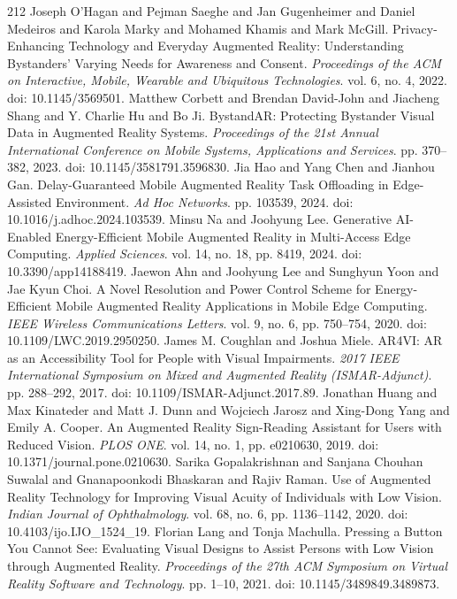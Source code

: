 \begin{thebibliography}{212}
 Joseph O'Hagan and Pejman Saeghe and Jan Gugenheimer and Daniel Medeiros and Karola Marky and Mohamed Khamis and Mark McGill. Privacy-Enhancing Technology and Everyday Augmented Reality: Understanding Bystanders' Varying Needs for Awareness and Consent. \emph{Proceedings of the ACM on Interactive, Mobile, Wearable and Ubiquitous Technologies}. vol. 6, no. 4, 2022. doi: 10.1145/3569501.
 Matthew Corbett and Brendan David-John and Jiacheng Shang and Y. Charlie Hu and Bo Ji. {BystandAR}: Protecting Bystander Visual Data in Augmented Reality Systems. \emph{Proceedings of the 21st Annual International Conference on Mobile Systems, Applications and Services}. pp. 370--382, 2023. doi: 10.1145/3581791.3596830.
 Jia Hao and Yang Chen and Jianhou Gan. Delay-Guaranteed Mobile Augmented Reality Task Offloading in Edge-Assisted Environment. \emph{Ad Hoc Networks}. pp. 103539, 2024. doi: 10.1016/j.adhoc.2024.103539.
 Minsu Na and Joohyung Lee. Generative AI-Enabled Energy-Efficient Mobile Augmented Reality in Multi-Access Edge Computing. \emph{Applied Sciences}. vol. 14, no. 18, pp. 8419, 2024. doi: 10.3390/app14188419.
 Jaewon Ahn and Joohyung Lee and Sunghyun Yoon and Jae Kyun Choi. A Novel Resolution and Power Control Scheme for Energy-Efficient Mobile Augmented Reality Applications in Mobile Edge Computing. \emph{IEEE Wireless Communications Letters}. vol. 9, no. 6, pp. 750--754, 2020. doi: 10.1109/LWC.2019.2950250.
 James M. Coughlan and Joshua Miele. {AR4VI}: {AR} as an Accessibility Tool for People with Visual Impairments. \emph{2017 IEEE International Symposium on Mixed and Augmented Reality (ISMAR-Adjunct)}. pp. 288--292, 2017. doi: 10.1109/ISMAR-Adjunct.2017.89.
 Jonathan Huang and Max Kinateder and Matt J. Dunn and Wojciech Jarosz and Xing-Dong Yang and Emily A. Cooper. An Augmented Reality Sign-Reading Assistant for Users with Reduced Vision. \emph{PLOS ONE}. vol. 14, no. 1, pp. e0210630, 2019. doi: 10.1371/journal.pone.0210630.
 Sarika Gopalakrishnan and Sanjana Chouhan Suwalal and Gnanapoonkodi Bhaskaran and Rajiv Raman. Use of Augmented Reality Technology for Improving Visual Acuity of Individuals with Low Vision. \emph{Indian Journal of Ophthalmology}. vol. 68, no. 6, pp. 1136--1142, 2020. doi: 10.4103/ijo.IJO_1524_19.
 Florian Lang and Tonja Machulla. Pressing a Button You Cannot See: Evaluating Visual Designs to Assist Persons with Low Vision through Augmented Reality. \emph{Proceedings of the 27th ACM Symposium on Virtual Reality Software and Technology}. pp. 1--10, 2021. doi: 10.1145/3489849.3489873.

\end{thebibliography}
